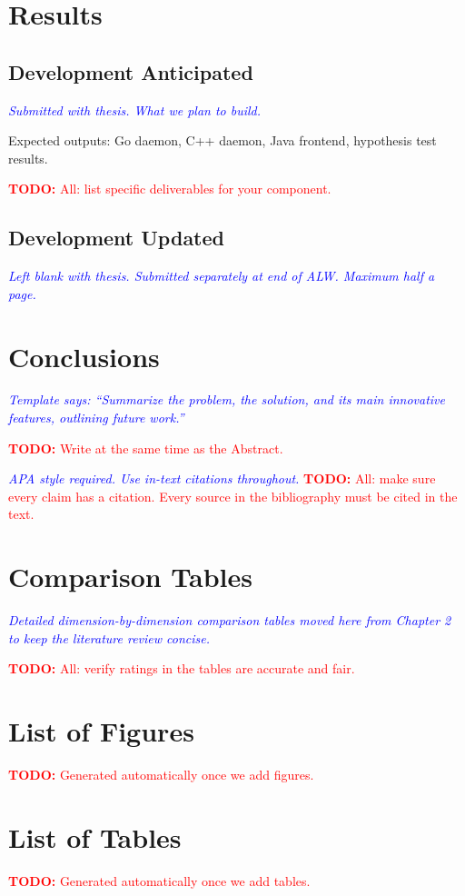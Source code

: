 \documentclass[12pt,oneside]{report}
\newcommand{\note}[1]{\textcolor{blue}{\textit{#1}}}
\newcommand{\todo}[1]{\textcolor{red}{\textbf{TODO:} #1}}
\begin{document}
\chapter{Results}

\section{Development Anticipated}
\note{Submitted with thesis. What we plan to build.}

Expected outputs: Go daemon, C++ daemon, Java frontend, hypothesis test results.

\todo{All: list specific deliverables for your component.}

\section{Development Updated}
\note{Left blank with thesis. Submitted separately at end of ALW. Maximum half a page.}

\chapter{Conclusions}

\note{Template says: ``Summarize the problem, the solution, and its main innovative features, outlining future work.''}

\todo{Write at the same time as the Abstract.}

\newpage
\note{APA style required. Use in-text citations throughout.}
\todo{All: make sure every claim has a citation. Every source in the bibliography must be cited in the text.}

\appendix
\chapter{Comparison Tables}
\note{Detailed dimension-by-dimension comparison tables moved here from Chapter 2 to keep the literature review concise.}

\todo{All: verify ratings in the tables are accurate and fair.}

\chapter{List of Figures}
\todo{Generated automatically once we add figures.}

\chapter{List of Tables}
\todo{Generated automatically once we add tables.}
\end{document}

